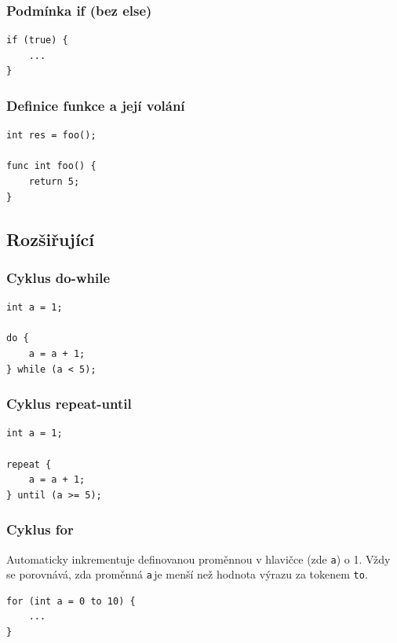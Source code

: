 \documentclass[czech, oth, kiv, he, iso690numb, viewonly]{fasthesis}
\begin{document}
    \subsubsection*{Podmínka if (bez else)}
    \begin{verbatim}
if (true) {
    ...
}
    \end{verbatim}

    \subsubsection*{Definice funkce a její volání}
    \begin{verbatim}
int res = foo();

func int foo() {
    return 5;
}
    \end{verbatim}

    \subsection{Rozšiřující}

    \subsubsection*{Cyklus do-while}
    \begin{verbatim}
int a = 1;

do {
    a = a + 1;
} while (a < 5);
    \end{verbatim}

    \subsubsection*{Cyklus repeat-until}
    \begin{verbatim}
int a = 1;

repeat {
    a = a + 1;
} until (a >= 5);
    \end{verbatim}

    \subsubsection*{Cyklus for}
    Automaticky inkrementuje definovanou proměnnou v hlavičce (zde \glqq\texttt{a}\grqq) o 1.
    Vždy se porovnává, zda proměnná \glqq\texttt{a}\grqq \,je menší než hodnota výrazu za tokenem \glqq\texttt{to}\grqq.
    \begin{verbatim}
for (int a = 0 to 10) {
    ...
}
    \end{verbatim}
\end{document}
